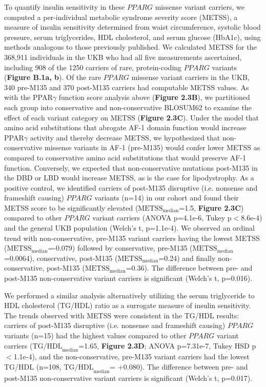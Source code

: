 To quantify insulin sensitivity in these \(PPARG\) missense variant carriers, we computed a per-individual metabolic syndrome severity score (METSS), a measure of insulin sensitivity determined from waist circumference, systolic blood pressure, serum triglycerides, HDL cholesterol, and serum glucose (HbA1c), using methods analogous to those previously published\cite{Gurka2014-ib,Cavero-Redondo2019-ce,Agarwal2012-qu}. We calculated METSS for the 368,911 individuals in the UKB who had all five measurements ascertained, including 908 of the 1250 carriers of rare, protein-coding \(PPARG\) variants (\textbf{Figure B.1a, b}). Of the rare \(PPARG\) missense variant carriers in the UKB, 340 pre-M135 and 370 post-M135 carriers had computable METSS values. As with the PPAR$\gamma$ function score analysis above (\textbf{Figure 2.3B}), we partitioned each group into conservative and non-conservative BLOSUM62 to examine the effect of each variant category on METSS (\textbf{Figure 2.3C}). Under the model that amino acid substitutions that abrogate AF-1 domain function would increase PPAR$\gamma$ activity and thereby decrease METSS, we hypothesized that non-conservative missense variants in AF-1 (pre-M135) would confer lower METSS as compared to conservative amino acid substitutions that would preserve AF-1 function. Conversely, we expected that non-conservative mutations post-M135 in the DBD or LBD would increase METSS, as is the case for lipodystrophy\cite{Jeninga2009-pt}. As a positive control, we identified carriers of post-M135 disruptive (i.e. nonsense and frameshift causing) \(PPARG\) variants (n=14) in our cohort and found their METSS score to be significantly elevated ($\mathrm{METSS}_{\mathrm{median}}$=1.5, \textbf{Figure 2.3C}) compared to other \(PPARG\) variant carriers (ANOVA p=4.1e-6, Tukey p$<$8.6e-4) and the general UKB population (Welch’s t, p=1.1e-4). We observed an ordinal trend with non-conservative, pre-M135 variant carriers having the lowest METSS ($\mathrm{METSS}_{\mathrm{median}}$=-0.079) followed by conservative, pre-M135 ($\mathrm{METSS}_{\mathrm{median}}$=0.0064), conservative, post-M135 ($\mathrm{METSS}_{\mathrm{median}}$=0.24) and finally non-conservative, post-M135 ($\mathrm{METSS}_{\mathrm{median}}$=0.36). The difference between pre- and post-M135 non-conservative variant carriers is significant (Welch’s t, p=0.016).

We performed a similar analysis alternatively utilizing the serum triglyceride to HDL cholesterol (TG/HDL) ratio as a surrogate measure of insulin sensitivity\cite{Oliveri2024-bz,DeForest2024-ex}. The trends observed with METSS were consistent in the TG/HDL results: carriers of post-M135 disruptive (i.e. nonsense and frameshift causing) \(PPARG\) variants (n=15) had the highest values compared to other \(PPARG\) variant carriers ($\mathrm{TG/HDL}_{\mathrm{median}}$=1.65, \textbf{Figure 2.3D}; ANOVA p=7.31e-7, Tukey HSD p$<$1.1e-4), and the non-conservative, pre-M135 variant carriers had the lowest TG/HDL (n=108, $\mathrm{TG/HDL}_{\mathrm{median}}$= +0.080). The difference between pre- and post-M135 non-conservative variant carriers is significant (Welch’s t, p=0.017).

